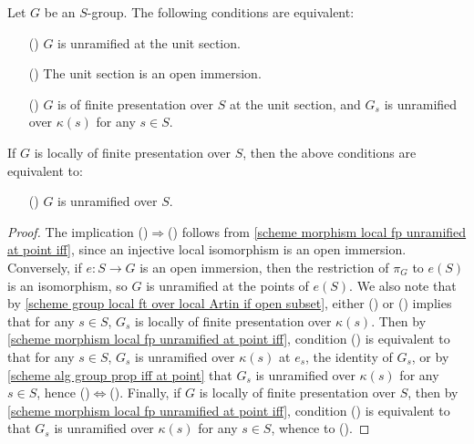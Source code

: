 \begin{proposition}\label{scheme group unramified at unit section iff}
Let $G$ be an $S$-group. The following conditions are equivalent:
\begin{enumerate}
    \item[(\rmnum{1})] $G$ is unramified at the unit section.
    \item[(\rmnum{2})] The unit section is an open immersion.
    \item[(\rmnum{3})] $G$ is of finite presentation over $S$ at the unit section, and $G_s$ is unramified over $\kappa(s)$ for any $s\in S$.
\end{enumerate}
If $G$ is locally of finite presentation over $S$, then the above conditions are equivalent to:
\begin{enumerate}
    \item[(\rmnum{4})] $G$ is unramified over $S$.
\end{enumerate}
\end{proposition}
\begin{proof}
The implication ()$\Rightarrow$() follows from \cref{scheme morphism local fp unramified at point iff}, since an injective local isomorphism is an open immersion. Conversely, if $e:S\to G$ is an open immersion, then the restriction of $\pi_G$ to $e(S)$ is an isomorphism, so $G$ is unramified at the points of $e(S)$. We also note that by \cref{scheme group local ft over local Artin if open subset}, either () or () implies that for any $s\in S$, $G_s$ is locally of finite presentation over $\kappa(s)$. Then by \cref{scheme morphism local fp unramified at point iff}, condition () is equivalent to that for any $s\in S$, $G_s$ is unramified over $\kappa(s)$ at $e_s$, the identity of $G_s$, or by \cref{scheme alg group prop iff at point} that $G_s$ is unramified over $\kappa(s)$ for any $s\in S$, hence ()$\Leftrightarrow$(). Finally, if $G$ is locally of finite presentation over $S$, then by \cref{scheme morphism local fp unramified at point iff}, condition () is equivalent to that $G_s$ is unramified over $\kappa(s)$ for any $s\in S$, whence to ().
\end{proof}

